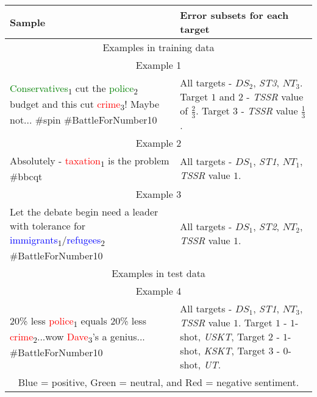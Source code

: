 \begin{tabular}{|p{7cm}|p{3cm}|}
\hline
Sample & Error subsets for each target \\
\hline
\multicolumn{2}{|c|}{Examples in training data} \\ 
\hline
\multicolumn{2}{|c|}{Example 1} \\
\hline
\textcolor{green}{Conservatives}\textsubscript{1} cut the \textcolor{green}{police}\textsubscript{2} budget and this cut \textcolor{red}{crime}\textsubscript{3}! Maybe not... \#spin \#BattleForNumber10 & All targets - $DS_2$, \textit{ST3}, $NT_3$. Target $1$ and $2$ - \textit{TSSR} value of $\frac{2}{3}$. Target $3$ - \textit{TSSR} value $\frac{1}{3}$. \\
\hline
\multicolumn{2}{|c|}{Example 2} \\
\hline
Absolutely - \textcolor{red}{taxation}\textsubscript{1} is the problem \#bbcqt & All targets - $DS_1$, \textit{ST1}, $NT_1$, \textit{TSSR} value $1$. \\
\hline
\multicolumn{2}{|c|}{Example 3} \\
\hline
Let the debate begin need a leader with tolerance for \textcolor{blue}{immigrants}\textsubscript{1}/\textcolor{blue}{refugees}\textsubscript{2} \#BattleForNumber10 & All targets - $DS_1$, \textit{ST2}, $NT_2$, \textit{TSSR} value $1$. \\
\hline
\multicolumn{2}{|c|}{Examples in test data} \\ 
\hline
\multicolumn{2}{|c|}{Example 4} \\
\hline
20\% less \textcolor{red}{police}\textsubscript{1} equals 20\% less \textcolor{red}{crime}\textsubscript{2}...wow \textcolor{red}{Dave}\textsubscript{3}'s a genius... \#BattleForNumber10 & All targets - $DS_1$, \textit{ST1}, $NT_3$, \textit{TSSR} value $1$. Target $1$ - $1$-shot, \textit{USKT}, Target 2 - $1$-shot, \textit{KSKT}, Target 3 - $0$-shot, \textit{UT}. \\
\hline
\multicolumn{2}{|c|}{Blue = positive, Green = neutral, and Red = negative sentiment.} \\
\hline
\end{tabular}